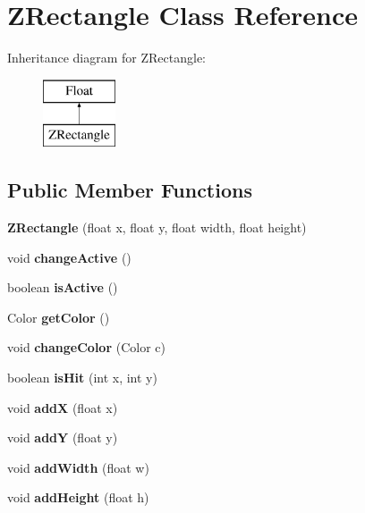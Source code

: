 \hypertarget{class_z_rectangle}{}\section{Z\+Rectangle Class Reference}
\label{class_z_rectangle}
Inheritance diagram for Z\+Rectangle\+:\begin{figure}[H]
\begin{center}
\leavevmode
\includegraphics[height=2.000000cm]{class_z_rectangle}
\end{center}
\end{figure}
\subsection*{Public Member Functions}
\begin{DoxyCompactItemize}
\item 
\mbox{\label{class_z_rectangle_acee0e23b738a3ad9ac81b03bb1926f20}} 
{\bfseries Z\+Rectangle} (float x, float y, float width, float height)
\item 
\mbox{\label{class_z_rectangle_a8c0726c0ad8dac001dfb140725e053dc}} 
void {\bfseries change\+Active} ()
\item 
\mbox{\label{class_z_rectangle_a282cd5d7d28589d69eec4b1b300a68ee}} 
boolean {\bfseries is\+Active} ()
\item 
\mbox{\label{class_z_rectangle_ae93e72310763ef5c8cf986ee8742871c}} 
Color {\bfseries get\+Color} ()
\item 
\mbox{\label{class_z_rectangle_ad35584292b4e8f0381a57f71d8a1ac22}} 
void {\bfseries change\+Color} (Color c)
\item 
\mbox{\label{class_z_rectangle_a4fafc725bd2d528a4c461308a6551831}} 
boolean {\bfseries is\+Hit} (int x, int y)
\item 
\mbox{\label{class_z_rectangle_a0a86d4da2bb5cf38a67f2383281e87d9}} 
void {\bfseries addX} (float x)
\item 
\mbox{\label{class_z_rectangle_aa1479d07a461ed586c2a5413e8f4677b}} 
void {\bfseries addY} (float y)
\item 
\mbox{\label{class_z_rectangle_abb3d81ce739819f51168418e2ac14c06}} 
void {\bfseries add\+Width} (float w)
\item 
\mbox{\label{class_z_rectangle_ae849086a6b72b6ecd087c9ebc783bd01}} 
void {\bfseries add\+Height} (float h)
\end{DoxyCompactItemize}
